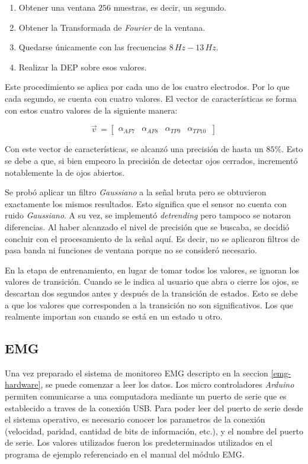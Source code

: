  \begin{enumerate}
 \item Obtener una ventana $256$ muestras, es decir, un segundo.
 \item Obtener la Transformada de \emph{Fourier} de la ventana.
 \item Quedarse únicamente con las frecuencias $8 \, Hz-13 \, Hz$.
 \item Realizar la DEP sobre esos valores.
 \end{enumerate}
 
Este procedimiento se aplica por cada uno de los cuatro electrodos. Por lo que cada segundo, se cuenta con cuatro valores. El vector de características se forma con estos cuatro valores de la siguiente manera:
 
\[
  \vec{v}^{\, }=
  \left[ {\begin{array}{cccc}
   \alpha_{AF7}  & \alpha_{AF8} & \alpha_{TP9} & \alpha_{TP10}  \     \end{array} } \right]
\] 

Con este vector de características, se alcanzó una precisión de hasta un $ 85 \%$. Esto se debe a que, si bien empeoro la precisión de detectar ojos cerrados, incrementó notablemente la de ojos abiertos.
 
 Se probó aplicar un filtro \emph{Gaussiano} a la señal bruta pero se obtuvieron exactamente los mismos resultados. Esto significa que el sensor no cuenta con ruido \emph{Gaussiano}. A su vez, se implementó \emph{detrending} pero tampoco se notaron diferencias. Al haber alcanzado el nivel de precisión que se buscaba, se decidió concluir con el procesamiento de la señal aquí. Es decir, no se aplicaron filtros de pasa banda ni funciones de ventana porque no se consideró necesario.
 
En la etapa de entrenamiento, en lugar de tomar todos los valores, se ignoran los valores de transición. Cuando se le indica al usuario que abra o cierre los ojos, se descartan dos segundos antes y después de la transición de estados. Esto se debe a que los valores que corresponden a la transición no son significativos. Los que realmente importan son cuando se está en un estado u otro.
 
\subsection{EMG} \label{sec:emg-signal-processing}

Una vez preparado el sistema de monitoreo EMG descripto en la seccion \ref{emg-hardware}, se puede comenzar a leer los datos. Los micro controladores \emph{Arduino} permiten comunicarse a una computadora mediante un puerto de serie que es establecido a traves de la conexión USB.  Para poder leer del puerto de serie desde el sistema operativo, es necesario conocer los parametros de la conexión (velocidad, paridad, cantidad de bits de información, etc.), y el nombre del puerto de serie. Los valores utilizados fueron los predeterminados utilizados en el programa de ejemplo referenciado en el manual del módulo EMG\cite{olimex-manual}.

